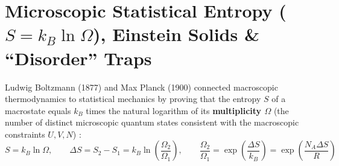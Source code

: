 \section{Microscopic Statistical Entropy ($S = k_B\ln\Omega$), Einstein Solids \& ``Disorder'' Traps}\label{sec:08.3}

Ludwig Boltzmann (1877) and Max Planck (1900) connected macroscopic thermodynamics to statistical mechanics by proving that the entropy $S$ of a macrostate equals $k_B$ times the natural logarithm of its \textbf{multiplicity $\Omega$} (the number of distinct microscopic quantum states consistent with the macroscopic constraints $U, V, N$) :
\begin{equation}\label{eq:08:boltzmann-s}
  \boxed{S = k_B \ln\Omega}, \qquad \Delta S = S_2 - S_1 = k_B\ln\left(\frac{\Omega_2}{\Omega_1}\right), \qquad \frac{\Omega_2}{\Omega_1} = \exp\left(\frac{\Delta S}{k_B}\right) = \exp\left(\frac{N_A\Delta S}{R}\right)
\end{equation}


